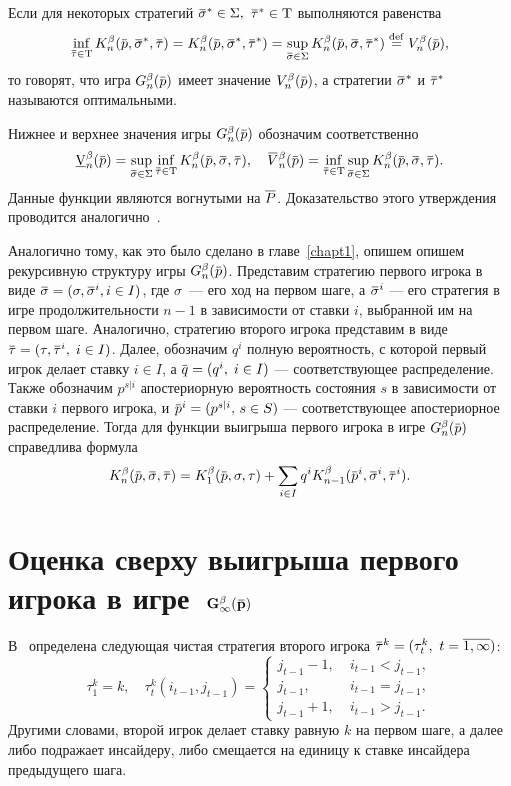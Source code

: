 {Если для некоторых стратегий $\sigmav^* \in \Sigma,$ $\tauv^* \in \Tau$ выполняются равенства
\begin{equation*}
  \inf_{\tauv \in \Tau} \K(\p, \sigmav^*, \tauv) =
  \K(\p, \sigmav^*, \tauv^*) =
  \sup_{\sigmav \in \Sigma} \K(\p, \sigmav, \tauv^*) \eqdef
  \V(\p),
\end{equation*}
то говорят, что игра $\theG(\p)$ имеет значение $\V(\p)$, а стратегии $\sigmav^*$ и $\tauv^*$
называются оптимальными.

Нижнее и верхнее значения игры $\theG(\p)$ обозначим соответственно
\begin{equation*}
  \LowV(\p) =
    \sup_{\sigmav \in \Sigma}
    \inf_{\tauv \in \Tau}
    \K(\p, \sigmav, \tauv), \quad
  \HighV(\p) =
    \inf_{\tauv \in \Tau}
    \sup_{\sigmav \in \Sigma}
    \K(\p, \sigmav, \tauv).
\end{equation*}
Данные функции являются вогнутыми на $\overline{P}$.
Доказательство этого утверждения проводится аналогично~\cite{domansky07}.

Аналогично тому, как это было сделано в главе~\ref{chapt1}, опишем опишем рекурсивную структуру игры $\theG(\p)$.
Представим стратегию первого игрока в виде $\sigmav = (\sigma, \sigmav^i, i \in I)$, где $\sigma$~--- его ход на первом шаге, а $\sigmav^i$ --- его стратегия в игре продолжительности $n-1$ в зависимости от ставки $i$, выбранной им на первом шаге.
Аналогично, стратегию второго игрока представим в виде $\tauv = (\tau, \tauv^i, \; i \in I)$.
%
Далее, обозначим $q^i$ полную вероятность, с которой первый игрок делает ставку $i \in I$, а $\q = (q^i, \; i \in I)$ --- соответствующее распределение.
Также обозначим $p^{s|i}$ апостериорную вероятность состояния $s$ в зависимости от ставки $i$ первого игрока, и $\p^i = (p^{s|i}, \, s \in S)$ --- соответствующее апостериорное распределение.
Тогда для функции выигрыша первого игрока в игре $\theG[n](\p)$ справедлива формула
\begin{equation*}
  \K[n](\p, \sigmav, \tauv) =
  \K[1](\p, \sigma, \tau) +
  \sum_{i \in I} q^i \K[n-1](\p^i, \sigmav^i, \tauv^i).
\end{equation*}

\section{Оценка сверху выигрыша первого игрока в игре~$\mathbf{G^\beta_\infty(\p)}$}
\label{ch3:sec:upper-bound}

В~\cite{domansky11} определена следующая чистая стратегия второго игрока $\tauv^k = (\tau^k_t,\ t = \overline{1, \infty})$:
\begin{equation*}
  \tau^k_1 = k, \quad
  \tau^k_t(i_{t-1}, j_{t-1}) = \begin{cases}
    j_{t-1} - 1, &\; i_{t-1} < j_{t-1},\\
    j_{t-1}, &\; i_{t-1} = j_{t-1},\\
    j_{t-1}+1, &\; i_{t-1} > j_{t-1}.
  \end{cases}
\end{equation*}
Другими словами, второй игрок делает ставку равную $k$ на первом шаге, а далее либо подражает инсайдеру, либо смещается на единицу к ставке инсайдера предыдущего шага.

}

